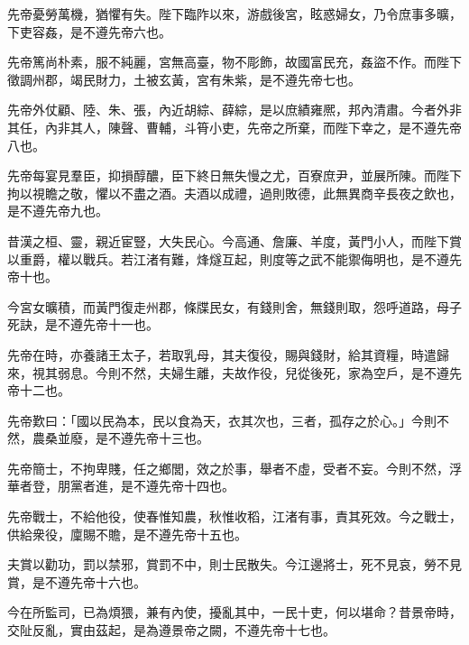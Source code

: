 \begin{pinyinscope}
 
 
 
 先帝憂勞萬機，猶懼有失。陛下臨阼以來，游戲後宮，眩惑婦女，乃令庶事多曠，下吏容姦，是不遵先帝六也。
 
 
 
 
 先帝篤尚朴素，服不純麗，宮無高臺，物不彫飾，故國富民充，姦盜不作。而陛下徵調州郡，竭民財力，土被玄黃，宮有朱紫，是不遵先帝七也。
 
 
 
 
 先帝外仗顧、陸、朱、張，內近胡綜、薛綜，是以庶績雍熈，邦內清肅。今者外非其任，內非其人，陳聲、曹輔，斗筲小吏，先帝之所棄，而陛下幸之，是不遵先帝八也。
 
 
 
 
 先帝每宴見羣臣，抑損醇醲，臣下終日無失慢之尤，百寮庶尹，並展所陳。而陛下拘以視瞻之敬，懼以不盡之酒。夫酒以成禮，過則敗德，此無異商辛長夜之飲也，是不遵先帝九也。
 
 
 
 
 昔漢之桓、靈，親近宦豎，大失民心。今高通、詹廉、羊度，黃門小人，而陛下賞以重爵，權以戰兵。若江渚有難，烽燧互起，則度等之武不能禦侮明也，是不遵先帝十也。
 
 
 
 
 今宮女曠積，而黃門復走州郡，條牒民女，有錢則舍，無錢則取，怨呼道路，母子死訣，是不遵先帝十一也。
 
 
 
 
 先帝在時，亦養諸王太子，若取乳母，其夫復役，賜與錢財，給其資糧，時遣歸來，視其弱息。今則不然，夫婦生離，夫故作役，兒從後死，家為空戶，是不遵先帝十二也。
 
 
 
 
 先帝歎曰：「國以民為本，民以食為天，衣其次也，三者，孤存之於心。」今則不然，農桑並廢，是不遵先帝十三也。
 
 
 
 
 先帝簡士，不拘卑賤，任之鄉閭，效之於事，舉者不虛，受者不妄。今則不然，浮華者登，朋黨者進，是不遵先帝十四也。
 
 
 
 
 先帝戰士，不給他役，使春惟知農，秋惟收稻，江渚有事，責其死效。今之戰士，供給衆役，廩賜不贍，是不遵先帝十五也。
 
 
 
 
 夫賞以勸功，罰以禁邪，賞罰不中，則士民散失。今江邊將士，死不見哀，勞不見賞，是不遵先帝十六也。
 
 
 
 
 今在所監司，已為煩猥，兼有內使，擾亂其中，一民十吏，何以堪命？昔景帝時，交阯反亂，實由茲起，是為遵景帝之闕，不遵先帝十七也。
 
 
 

\end{pinyinscope}
